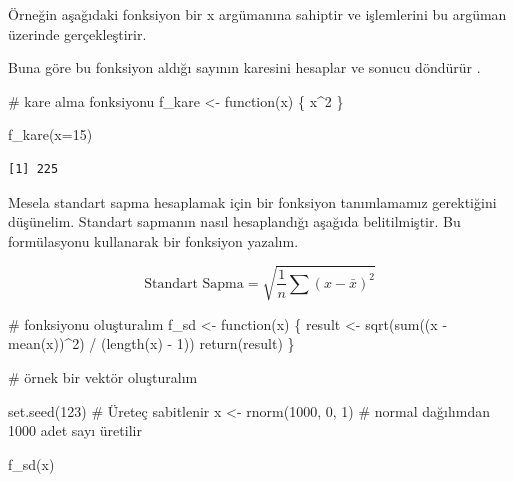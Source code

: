 \documentclass[
  letterpaper,
  DIV=11,
  numbers=noendperiod]{scrreprt}
\newenvironment{Shaded}{\begin{snugshade}}{\end{snugshade}}
\newcommand{\AttributeTok}[1]{\textcolor[rgb]{0.40,0.45,0.13}{#1}}
\newcommand{\CommentTok}[1]{\textcolor[rgb]{0.37,0.37,0.37}{#1}}
\newcommand{\ControlFlowTok}[1]{\textcolor[rgb]{0.00,0.23,0.31}{#1}}
\newcommand{\DecValTok}[1]{\textcolor[rgb]{0.68,0.00,0.00}{#1}}
\newcommand{\FunctionTok}[1]{\textcolor[rgb]{0.28,0.35,0.67}{#1}}
\newcommand{\NormalTok}[1]{\textcolor[rgb]{0.00,0.23,0.31}{#1}}
\newcommand{\OtherTok}[1]{\textcolor[rgb]{0.00,0.23,0.31}{#1}}
\newcommand{\SpecialCharTok}[1]{\textcolor[rgb]{0.37,0.37,0.37}{#1}}
\begin{document}
Örneğin aşağıdaki fonksiyon bir x argümanına sahiptir ve işlemlerini bu
argüman üzerinde gerçekleştirir.

Buna göre bu fonksiyon aldığı sayının karesini hesaplar ve sonucu
döndürür .

\begin{Shaded}
\begin{Highlighting}[]
\CommentTok{\# kare alma fonksiyonu}
\NormalTok{f\_kare }\OtherTok{\textless{}{-}} \ControlFlowTok{function}\NormalTok{(x) \{}
\NormalTok{   x}\SpecialCharTok{\^{}}\DecValTok{2}
\NormalTok{ \}}

\FunctionTok{f\_kare}\NormalTok{(}\AttributeTok{x=}\DecValTok{15}\NormalTok{)}
\end{Highlighting}
\end{Shaded}

\begin{verbatim}
[1] 225
\end{verbatim}

Mesela standart sapma hesaplamak için bir fonksiyon tanımlamamız
gerektiğini düşünelim. Standart sapmanın nasıl hesaplandığı aşağıda
belitilmiştir. Bu formülasyonu kullanarak bir fonksiyon yazalım.

\[\text{Standart Sapma} = \sqrt{\frac{1}{n} \sum{(x - \bar{x})^2}}\]

\begin{Shaded}
\begin{Highlighting}[]
\CommentTok{\# fonksiyonu oluşturalım}
\NormalTok{f\_sd }\OtherTok{\textless{}{-}} \ControlFlowTok{function}\NormalTok{(x) \{}
\NormalTok{  result }\OtherTok{\textless{}{-}} \FunctionTok{sqrt}\NormalTok{(}\FunctionTok{sum}\NormalTok{((x }\SpecialCharTok{{-}} \FunctionTok{mean}\NormalTok{(x))}\SpecialCharTok{\^{}}\DecValTok{2}\NormalTok{) }\SpecialCharTok{/}\NormalTok{ (}\FunctionTok{length}\NormalTok{(x) }\SpecialCharTok{{-}} \DecValTok{1}\NormalTok{))}
  \FunctionTok{return}\NormalTok{(result)}
\NormalTok{\}}

\CommentTok{\# örnek bir vektör oluşturalım}

\FunctionTok{set.seed}\NormalTok{(}\DecValTok{123}\NormalTok{) }\CommentTok{\# Üreteç sabitlenir}
\NormalTok{x }\OtherTok{\textless{}{-}} \FunctionTok{rnorm}\NormalTok{(}\DecValTok{1000}\NormalTok{, }\DecValTok{0}\NormalTok{, }\DecValTok{1}\NormalTok{) }\CommentTok{\# normal dağılımdan 1000 adet sayı üretilir}

\FunctionTok{f\_sd}\NormalTok{(x)}
\end{Highlighting}
\end{Shaded}
\end{document}
